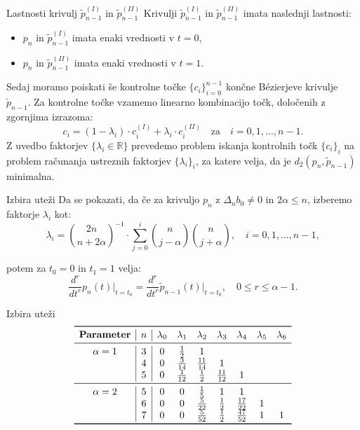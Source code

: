 \documentclass{beamer}
\begin{document}
\begin{frame}{Lastnosti krivulj \(\tilde{p}_{n-1}^{(I)}\) in \(\tilde{p}_{n-1}^{(II)}\)}
    Krivulji \(\tilde{p}_{n-1}^{(I)}\) in \(\tilde{p}_{n-1}^{(II)}\) imata naslednji lastnosti:
    \begin{itemize}
        \item \(p_n\) in \(\tilde{p}_{n-1}^{(I)}\) imata enaki vrednosti v \(t = 0\),
        \item \(p_n\) in \(\tilde{p}_{n-1}^{(II)}\) imata enaki vrednosti v \(t = 1\).
    \end{itemize}
\end{frame}


\begin{frame}
  Sedaj moramo poiskati še kontrolne točke $\{c_i\}_{i=0}^{n-1}$ končne Bézierjeve krivulje $\tilde{p}_{n-1}$.
  Za kontrolne točke vzamemo linearno kombinacijo točk, določenih z zgornjima izrazoma:
  \[ c_i = (1 - \lambda_i) \cdot c_i^{(I)} + \lambda_i \cdot c_i^{(II)} \quad \text{za} \quad i = 0, 1, \ldots, n - 1. \]
  Z uvedbo faktorjev $\{\lambda_i \in \mathbb{R}\}$ prevedemo problem iskanja kontrolnih točk $\{c_i\}_i$ na problem računanja ustreznih faktorjev $\{\lambda_i\}_i$, za katere velja, da je $d_2(p_n, \tilde{p}_{n-1})$ minimalna.
\end{frame}

\begin{frame}{Izbira uteži}
   Da se pokazati, da če za krivuljo $p_n$ z $\Delta_n b_0 \neq 0$ in $2\alpha \leq n$, izberemo faktorje $\lambda_i$ kot: 
\[
\lambda_i = \binom{2n}{n + 2\alpha}^{-1} \cdot \sum_{j=0}^i \binom{n}{j - \alpha} \binom{n}{j + \alpha}, \quad i = 0, 1, \ldots, n - 1,
\]

    potem za $t_0 = 0$ in $t_1 = 1$ velja:
    \[
    \frac{d^r}{dt^r} p_n(t) \bigg|_{t=t_0} = \frac{d^r}{dt^r} \tilde{p}_{n-1}(t) \bigg|_{t=t_0}, \quad 0 \leq r \leq \alpha - 1.
    \]
\end{frame}

\begin{frame}{Izbira uteži}
\[
\begin{array}{c|c|ccccccc}
\toprule
\textbf{Parameter} & n & \lambda_0 & \lambda_1 & \lambda_2 & \lambda_3 & \lambda_4 & \lambda_5 & \lambda_6 \\
\midrule
\alpha = 1 & 3 & 0 & \frac{1}{2} & 1 & & & & \\
           & 4 & 0 & \frac{3}{14} & \frac{11}{14} & 1 & & & \\
           & 5 & 0 & \frac{1}{12} & \frac{1}{2} & \frac{11}{12} & 1 & & \\
\midrule
\alpha = 2 & 5 & 0 & 0 & \frac{1}{5} & 1 & 1 & & \\
           & 6 & 0 & 0 & \frac{5}{22} & \frac{1}{2} & \frac{17}{22} & 1 & \\
           & 7 & 0 & 0 & \frac{5}{52} & \frac{1}{2} & \frac{47}{52} & 1 & 1 \\
\bottomrule
\end{array}
\]
\end{frame}
\end{document}

